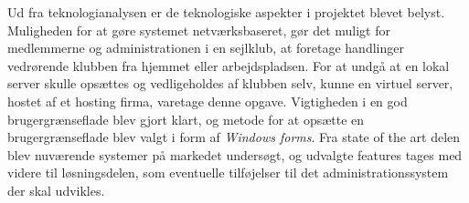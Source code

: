 Ud fra teknologianalysen er de teknologiske aspekter i projektet blevet belyst. Muligheden for at gøre
systemet netværksbaseret, gør det muligt for medlemmerne og administrationen i en sejlklub, at foretage
handlinger vedrørende klubben fra hjemmet eller arbejdspladsen. For at undgå at en lokal server skulle
opsættes og vedligeholdes af klubben selv, kunne en virtuel server, hostet af et hosting firma, varetage denne
opgave. Vigtigheden i en god brugergrænseflade blev gjort klart, og metode for at opsætte en brugergrænseflade
blev valgt i form af \textit{Windows forms}. Fra state of the art delen blev nuværende systemer på markedet
undersøgt, og udvalgte features tages med videre til løsningsdelen, som eventuelle tilføjelser til det
administrationssystem der skal udvikles.


